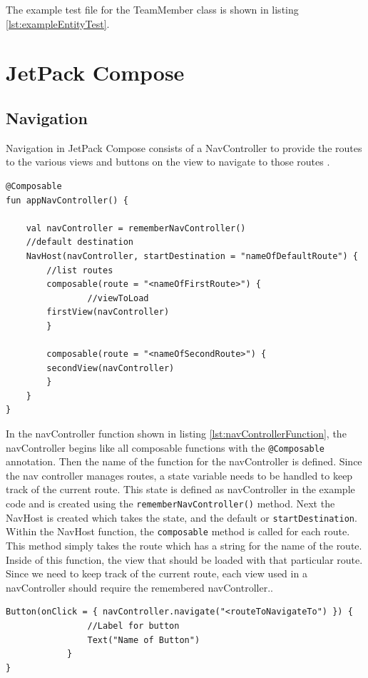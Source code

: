 \documentclass[12pt]{article}
\begin{document}


The example test file for the TeamMember class is shown in listing \ref{lst:exampleEntityTest}. 


\section{JetPack Compose}

\subsection{Navigation}
Navigation in JetPack Compose consists of a NavController to provide the routes to the various views and buttons on the view to navigate to those routes \cite{mediumJetpackNavigation} \cite{NavigationCodeLab}. 



\begin{lstlisting}[numbers=none, 
			caption=Function to create a simple Nav Controller,
			label={lst:navControllerFunction}]
@Composable
fun appNavController() {

    val navController = rememberNavController()
    //default destination
    NavHost(navController, startDestination = "nameOfDefaultRoute") {
    	//list routes
        composable(route = "<nameOfFirstRoute>") {
        	    //viewToLoad
	    firstView(navController)
        }
        
        composable(route = "<nameOfSecondRoute>") {
	    secondView(navController)
        }
    }
}
\end{lstlisting}

In the navController function shown in listing \ref{lst:navControllerFunction}, the navController begins like all composable functions with the \verb|@Composable| annotation. Then the name of the function for the navController is defined. Since the nav controller manages routes, a state variable needs to be handled to keep track of the current route. This state is defined as navController in the example code and is created using the \verb|rememberNavController()| method. Next the NavHost is created which takes the state, and the default or \verb|startDestination|. Within the NavHost function, the \verb|composable| method is called for each route. This method simply takes the route which has a string for the name of the route. Inside of this function, the view that should be loaded with that particular route. Since we need to keep track of the current route, each view used in a navController should require the remembered navController..  
\begin{lstlisting}[numbers=none, 
			caption=Button to navigate to a view,
			label={lst:navButton}]
Button(onClick = { navController.navigate("<routeToNavigateTo") }) {
                //Label for button
                Text("Name of Button")
            }
}
\end{lstlisting}
\end{document}
